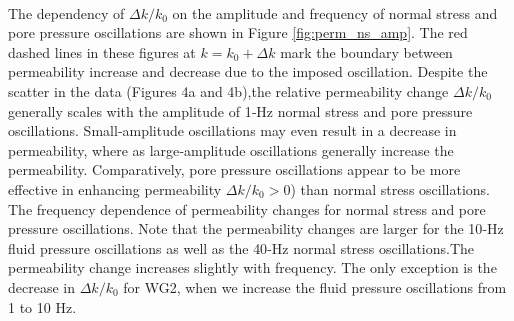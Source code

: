 \paragraph{}
The dependency of $ \Delta k/k_0 $ on the amplitude and frequency of normal stress and pore pressure oscillations are shown in Figure \ref{fig:perm_ns_amp}. The red dashed lines in these figures at $ k = k_0 + \Delta k $ mark the boundary between permeability increase and decrease due to the imposed oscillation. Despite the scatter in the data (Figures 4a and 4b),the relative permeability change $ \Delta k/k_0 $ generally scales with the amplitude of 1‐Hz normal stress and pore pressure oscillations. Small‐amplitude oscillations may even result in a decrease in permeability, where as large‐amplitude oscillations generally increase the permeability. Comparatively, pore pressure oscillations appear to be more effective in enhancing permeability $ \Delta k/k_0 > 0$) than normal stress oscillations. The frequency dependence of permeability changes for normal stress and pore pressure oscillations. Note that the permeability changes are larger for the 10‐Hz fluid pressure oscillations as well as the 40‐Hz normal stress oscillations.The permeability change increases slightly with frequency. The only exception is the decrease in $ \Delta k/k_0 $ for WG2, when we increase the fluid pressure oscillations from 1 to 10 Hz.

